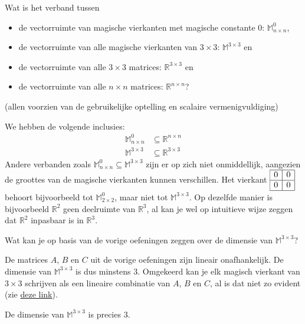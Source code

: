 \documentclass{ximera}
\begin{document}
\begin{exercise}
    Wat is het verband tussen
    \begin{itemize}
        \item de vectorruimte van magische vierkanten met magische constante \(0\): \(\mathbb{M}_{n\times n}^0\),
        \item de vectorruimte van alle magische vierkanten van \(3 \times 3\): \(\mathbb{M}^{3 \times 3}\) en
        \item de vectorruimte van alle \(3 \times 3\) matrices: \(\mathbb{R}^{3 \times 3}\) en
        \item de vectorruimte van alle \(n \times n\) matrices: \(\mathbb{R}^{n \times n}\)?
    \end{itemize}
    (allen voorzien van de gebruikelijke optelling en scalaire vermenigvuldiging)
    \begin{oplossing}
        We hebben de volgende inclusies:
        \begin{align*}
            \mathbb{M}_{n\times n}^0 &\subseteq \mathbb{R}^{n \times n}\\
            \mathbb{M}^{3 \times 3} &\subseteq \mathbb{R}^{3 \times 3}
        \end{align*}
        Andere verbanden zoals \(\mathbb{M}_{n\times n}^0 \subseteq \mathbb{M}^{3 \times 3}\) zijn er op zich niet onmiddellijk, aangezien de groottes van de magische vierkanten kunnen verschillen.
        Het vierkant \(
        \begin{array}{|c|c|}
        \hline
        0 & 0 \\
        \hline
        0 & 0 \\
        \hline
        \end{array}
        \)
        behoort bijvoorbeeld tot \(\mathbb{M}_{2\times 2}^0\), maar niet tot \(\mathbb{M}^{3 \times 3}\).
        Op dezelfde manier is bijvoorbeeld \(\mathbb{R}^2\) geen deelruimte van \(\mathbb{R}^{3}\), al kan je wel op intuitieve wijze zeggen dat \(\mathbb{R}^2\) inpasbaar is in \(\mathbb{R}^{3}\).
    \end{oplossing}
\end{exercise}

\begin{exercise}
    Wat kan je op basis van de vorige oefeningen zeggen over de dimensie van \(\mathbb{M}^{3 \times 3}\)?
    \begin{oplossing}
        De matrices \(A\), \(B\) en \(C\) uit de vorige oefeningen zijn lineair onafhankelijk.
        De dimensie van \(\mathbb{M}^{3 \times 3}\) is dus minstens \(3\).
        Omgekeerd kan je elk magisch vierkant van \(3 \times 3\) schrijven als een lineaire combinatie van \(A\), \(B\) en \(C\), al is dat niet zo evident (zie \href{https://math.stackexchange.com/questions/2137182/showing-a-set-of-matrices-is-a-basis-of-all-3x3-magic-squares}{deze link}).

        De dimensie van \(\mathbb{M}^{3 \times 3}\) is precies \(3\).
    \end{oplossing}
\end{exercise}

\end{document}
